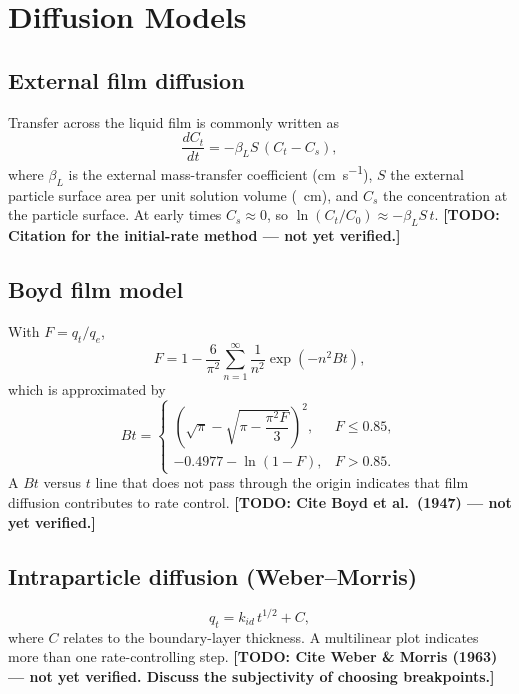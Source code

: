 \documentclass[11pt,a4paper]{article}
\newcommand{\todo}[1]{\textbf{[TODO: #1]}}
\begin{document}
\section{Diffusion Models}
\label{sec:diffusion}

\subsection{External film diffusion}
Transfer across the liquid film is commonly written as
\begin{equation}
  \frac{dC_t}{dt} = -\beta_L S\,(C_t - C_s),
  \label{eq:film}
\end{equation}
where $\beta_L$ is the external mass-transfer coefficient
(\si{\centi\meter\per\second}), $S$ the external particle surface area
per unit solution volume (\si{\per\centi\meter}), and $C_s$ the
concentration at the particle surface. At early times $C_s \approx 0$, so
$\ln(C_t/C_0) \approx -\beta_L S\, t$.
\todo{Citation for the initial-rate method --- not yet verified.}

\subsection{Boyd film model}
With $F = q_t/q_e$,
\begin{equation}
  F = 1 - \frac{6}{\pi^2}\sum_{n=1}^{\infty}\frac{1}{n^2}
      \exp\!\left(-n^2 B t\right),
  \label{eq:boyd}
\end{equation}
which is approximated by
\begin{equation}
  Bt =
  \begin{cases}
    \left(\sqrt{\pi} - \sqrt{\pi - \dfrac{\pi^2 F}{3}}\right)^{2},
      & F \le 0.85,\\[2ex]
    -0.4977 - \ln(1 - F), & F > 0.85.
  \end{cases}
  \label{eq:boyd-approx}
\end{equation}
A $Bt$ versus $t$ line that does not pass through the origin indicates
that film diffusion contributes to rate control.
\todo{Cite Boyd et al.\ (1947) --- not yet verified.}

\subsection{Intraparticle diffusion (Weber--Morris)}
\begin{equation}
  q_t = k_{id}\, t^{1/2} + C,
  \label{eq:weber-morris}
\end{equation}
where $C$ relates to the boundary-layer thickness. A multilinear plot
indicates more than one rate-controlling step.
\todo{Cite Weber \& Morris (1963) --- not yet verified. Discuss the
subjectivity of choosing breakpoints.}
\end{document}
